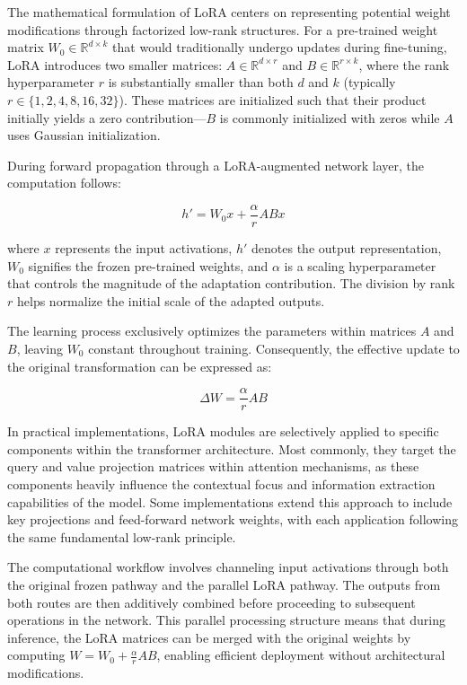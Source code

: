 The mathematical formulation of LoRA centers on representing potential weight modifications through factorized low-rank structures. For a pre-trained weight matrix $W_0 \in \mathbb{R}^{d \times k}$ that would traditionally undergo updates during fine-tuning, LoRA introduces two smaller matrices: $A \in \mathbb{R}^{d \times r}$ and $B \in \mathbb{R}^{r \times k}$, where the rank hyperparameter $r$ is substantially smaller than both $d$ and $k$ (typically $r \in \{1, 2, 4, 8, 16, 32\}$). These matrices are initialized such that their product initially yields a zero contribution—$B$ is commonly initialized with zeros while $A$ uses Gaussian initialization.

During forward propagation through a LoRA-augmented network layer, the computation follows:

\begin{equation}
h' = W_0 x + \frac{\alpha}{r} A B x
\end{equation}

where $x$ represents the input activations, $h'$ denotes the output representation, $W_0$ signifies the frozen pre-trained weights, and $\alpha$ is a scaling hyperparameter that controls the magnitude of the adaptation contribution. The division by rank $r$ helps normalize the initial scale of the adapted outputs.

The learning process exclusively optimizes the parameters within matrices $A$ and $B$, leaving $W_0$ constant throughout training. Consequently, the effective update to the original transformation can be expressed as:

\begin{equation}
\Delta W = \frac{\alpha}{r} A B
\end{equation}

In practical implementations, LoRA modules are selectively applied to specific components within the transformer architecture. Most commonly, they target the query and value projection matrices within attention mechanisms, as these components heavily influence the contextual focus and information extraction capabilities of the model. Some implementations extend this approach to include key projections and feed-forward network weights, with each application following the same fundamental low-rank principle.

The computational workflow involves channeling input activations through both the original frozen pathway and the parallel LoRA pathway. The outputs from both routes are then additively combined before proceeding to subsequent operations in the network. This parallel processing structure means that during inference, the LoRA matrices can be merged with the original weights by computing $W = W_0 + \frac{\alpha}{r} A B$, enabling efficient deployment without architectural modifications.

